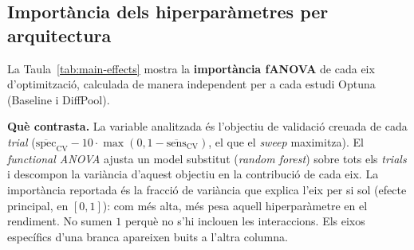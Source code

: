 \documentclass[10pt,a4paper,twocolumn,twoside]{article}
\begin{document}
\newpage

\subsection{Importància dels hiperparàmetres per arquitectura}
\label{app:main-effects}

La Taula~\ref{tab:main-effects} mostra la \textbf{importància fANOVA} de cada eix
d'optimització, calculada de manera independent per a cada estudi Optuna (Baseline i
DiffPool).

\textbf{Què contrasta.} La variable analitzada és l'objectiu de validació creuada de cada
\textit{trial} ($\overline{\text{spec}}_{\text{CV}} - 10\cdot\max(0,
1-\overline{\text{sens}}_{\text{CV}})$, el que el \textit{sweep} maximitza). El
\textit{functional ANOVA} ajusta un model substitut (\textit{random forest}) sobre tots els
\textit{trials} i descompon la variància d'aquest objectiu en la contribució de cada eix. La
importància reportada és la fracció de variància que explica l'eix per si sol (efecte
principal, en $[0, 1]$): com més alta, més pesa aquell hiperparàmetre en el rendiment. No
sumen $1$ perquè no s'hi inclouen les interaccions. Els eixos específics d'una branca
apareixen buits a l'altra columna.
\end{document}
